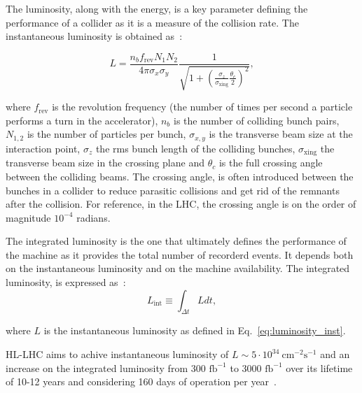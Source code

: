 The luminosity, along with the energy, is a key parameter defining the performance of a collider as it is a measure of the collision rate. The instantaneous luminosity is obtained as~\cite{luminosity}:

\begin{equation}\label{eq:luminosity_inst}
    L = \frac{n_b f_\mathrm{rev}N_1 N_2}{4 \pi \sigma_x \sigma_y} \frac{1}{\sqrt{1+\left ( \frac{\sigma_z}{\sigma_\mathrm{xing}} \frac{\theta_c}{2} \right )^2}},
\end{equation}

where $f_{\mathrm{rev}}$ is the revolution frequency (the number of times per second a particle performs a turn in the accelerator), $n_b$ is the number of colliding bunch pairs, $N_{1,2}$ is the number of particles per bunch, $\sigma_{x,y}$ is the transverse beam size at the interaction point, $\sigma_z$ the rms bunch length of the colliding bunches, $\sigma_{\mathrm{xing}}$ the transverse beam size in the crossing plane and $\theta_c$ is the full crossing angle between the colliding beams. %
 The crossing angle, is often introduced between the bunches in a collider to reduce parasitic collisions and get rid of the remnants after the collision. For reference, in the LHC, the crossing angle is on the order of magnitude $10^{-4}$ radians. %

The integrated luminosity is the one that ultimately defines the performance of the machine as it provides the total number of recorderd events. It depends both on the instantaneous luminosity and on the machine availability. The integrated luminosity, is expressed as~\cite{HL_LHC_yellow_report}:
\begin{equation}\label{eq:integrated_luminosity}
    L_\mathrm{int} \equiv \int_{\Delta t} L dt,
\end{equation}

where $L$ is the instantaneous luminosity as defined in Eq.~\eqref{eq:luminosity_inst}.

HL-LHC aims to achive instantaneous luminosity of $L \sim 5 \cdot 10^{34} \ \mathrm{cm^{-2} s^{-1}}$ and an increase on the integrated luminosity from 300 $\mathrm{fb^{-1}}$ to 3000 $\mathrm{fb^{-1}}$ over its lifetime of 10-12 years and considering 160 days of operation per year~\cite{Brunning_Rossi}. %

